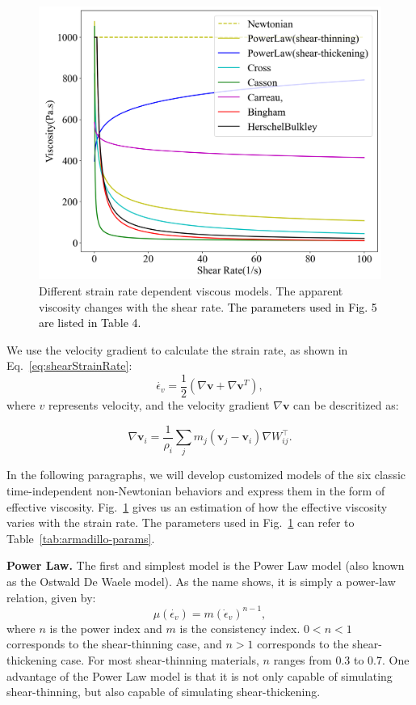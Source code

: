 \documentclass[10pt,journal,compsoc]{IEEEtran}
\newcommand{\revised}[1]{{\textcolor{black}{#1}}}
\begin{document}
\begin{figure}[htbp]
	\centering
	\includegraphics[width=.9\linewidth]{pics/linechart.png}
	\caption{Different strain rate dependent viscous models. The apparent viscosity changes with the shear rate. \revised{The parameters used in Fig. 5 are listed in Table 4.}}     \label{fig:6NonNewtonsLineChart}
\end{figure}

We use the velocity gradient to calculate the strain rate, as shown in Eq.~\ref{eq:shearStrainRate}:
\begin{equation}
	\dot{\epsilon_v}=\frac{1}{2} \left(\nabla \mathbf{v}+\nabla \mathbf{v}^T\right) \label{eq:shearStrainRate},
\end{equation}
where $v$ represents velocity, and the velocity gradient $\nabla \mathbf{v}$ can be descritized as:

\begin{equation}
	\nabla \mathbf{v}_i=\frac{1}{\rho_i} \sum_j m_j\left(\mathbf{v}_j-\mathbf{v}_i\right) \nabla W_{i j}^{\top}. \label{eq:velGradient}
\end{equation}

In the following paragraphs, we will develop customized models of the six classic time-independent non-Newtonian behaviors and express them in the form of effective viscosity. Fig.~\ref{fig:6NonNewtonsLineChart} gives us an estimation of how the effective viscosity varies with the strain rate. The parameters used in Fig.~\ref{fig:6NonNewtonsLineChart} can refer to Table~\ref{tab:armadillo-params}.

\textbf{Power Law.}
The first and simplest model is the Power Law model (also known as the Ostwald De Waele model). As the name shows, it is simply a power-law relation, given by:
\begin{equation}
	\mu(\dot{\epsilon_v}) = m (\dot\epsilon_v)^{n-1} \label{eq:powerLaw},
\end{equation}
where $n$ is the power index and $m$ is the consistency index. $0<n<1$ corresponds to the shear-thinning case, and $n>1$ corresponds to the shear-thickening case. For most shear-thinning materials, $n$ ranges from 0.3 to 0.7. One advantage of the Power Law model is that it is not only capable of simulating shear-thinning, but also capable of simulating shear-thickening.
\end{document}
